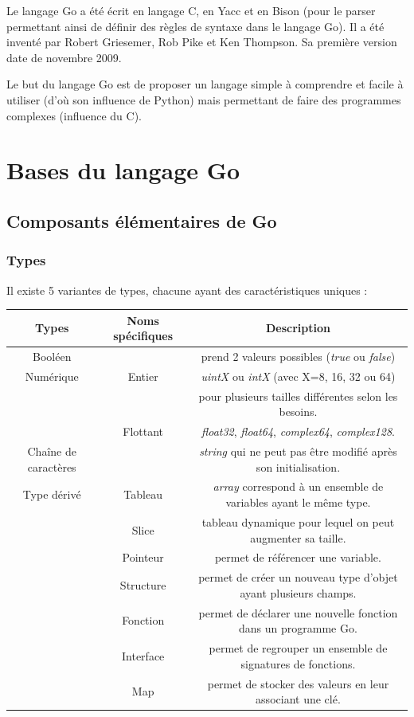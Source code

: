 \documentclass[11pt]{article}
\begin{document}
Le langage Go a été écrit en langage C, en Yacc et en Bison (pour le parser permettant ainsi de définir des règles de syntaxe dans le langage Go). Il a été inventé par Robert Griesemer, Rob Pike et Ken Thompson. Sa première version date de novembre 2009. 

Le but du langage Go est de proposer un langage simple à comprendre et facile à utiliser (d'où son influence de Python) mais permettant de faire des programmes complexes (influence du C). 


\section{Bases du langage Go}

\subsection{Composants élémentaires de Go}

\subsubsection{Types}

Il existe 5 variantes de types, chacune ayant des caractéristiques uniques : 

\begin{tabular}[h]{|c|c|c|}
	\hline
	Types & Noms spécifiques & Description \\
	\hline
	Booléen & & prend 2 valeurs possibles (\textit{true} ou \textit{false}) \\
	\hline
	Numérique & Entier & \textit{uintX} ou \textit{intX} (avec X=8, 16, 32 ou 64) \\
	 & & pour plusieurs tailles différentes selon les besoins. \\
	& Flottant &  \textit{float32}, \textit{float64}, \textit{complex64}, \textit{complex128}. \\
	\hline 
	Chaîne de caractères & & \textit{string} qui ne peut pas être modifié après son initialisation. \\
	\hline
	Type dérivé & Tableau & \textit{array} correspond à un ensemble de variables ayant le même type. \\
	 & Slice & tableau dynamique pour lequel on peut augmenter sa taille. \\
	 & Pointeur & permet de référencer une variable. \\
	 & Structure & permet de créer un nouveau type d'objet ayant plusieurs champs. \\
	 & Fonction & permet de déclarer une nouvelle fonction dans un programme Go. \\
	 & Interface & permet de regrouper un ensemble de signatures de fonctions. \\
	 & Map & permet de stocker des valeurs en leur associant une clé. \\
	 \hline 
	
	
\end{tabular}
\end{document}
